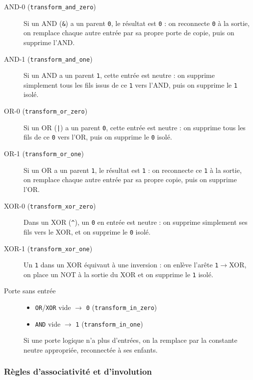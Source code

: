 \documentclass[a4paper,12pt]{article}
\begin{document}
\begin{description}
    \item[AND-0 (\texttt{transform\_and\_zero})]
    Si un AND (\texttt{\&}) a un parent \texttt{0}, le résultat est \texttt{0} : on reconnecte \texttt{0} à la sortie, on remplace chaque autre entrée par sa propre porte de copie, puis on supprime l’AND.

    \item[AND-1 (\texttt{transform\_and\_one})]
    Si un AND a un parent \texttt{1}, cette entrée est neutre : on supprime simplement tous les fils issus de ce \texttt{1} vers l’AND, puis on supprime le \texttt{1} isolé.

    \item[OR-0 (\texttt{transform\_or\_zero})]
    Si un OR (\texttt{|}) a un parent \texttt{0}, cette entrée est neutre : on supprime tous les fils de ce \texttt{0} vers l’OR, puis on supprime le \texttt{0} isolé.

    \item[OR-1 (\texttt{transform\_or\_one})]
    Si un OR a un parent \texttt{1}, le résultat est \texttt{1} : on reconnecte ce \texttt{1} à la sortie, on remplace chaque autre entrée par sa propre copie, puis on supprime l’OR.

    \item[XOR-0 (\texttt{transform\_xor\_zero})]
    Dans un XOR (\texttt{\^}), un \texttt{0} en entrée est neutre : on supprime simplement ses fils vers le XOR, et on supprime le \texttt{0} isolé.

    \item[XOR-1 (\texttt{transform\_xor\_one})]
    Un \texttt{1} dans un XOR équivaut à une inversion : on enlève l’arête \texttt{1}$\rightarrow$XOR, on place un NOT à la sortie du XOR et on supprime le \texttt{1} isolé.

    \item[Porte sans entrée]
    \begin{itemize}
        \item \texttt{OR}/\texttt{XOR} vide $\rightarrow$ \texttt{0} (\texttt{transform\_in\_zero})
        \item \texttt{AND} vide $\rightarrow$ \texttt{1} (\texttt{transform\_in\_one})
    \end{itemize}
    Si une porte logique n’a plus d’entrées, on la remplace par la constante neutre appropriée, reconnectée à ses enfants.
\end{description}

\subsubsection{Règles d’associativité et d’involution}
\end{document}
